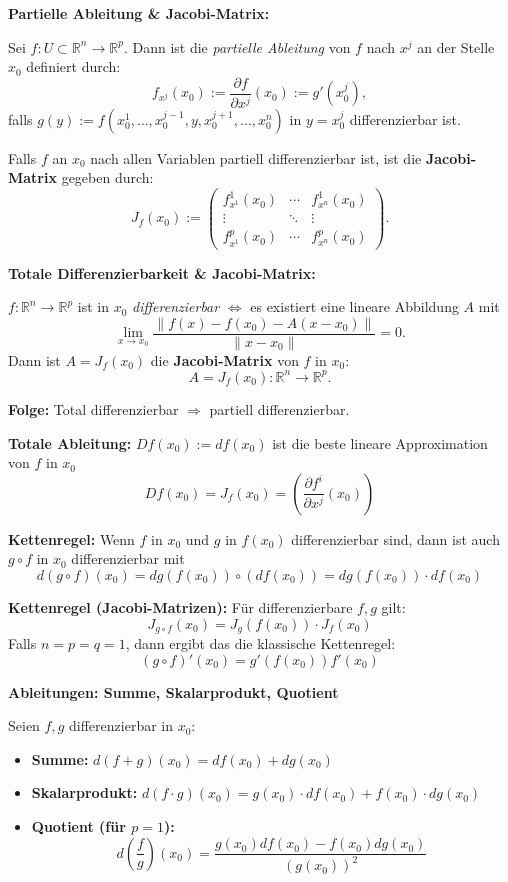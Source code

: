 \textbf{Partielle Ableitung \& Jacobi-Matrix:}

Sei $f : U \subset \mathbb{R}^n \to \mathbb{R}^p$. Dann ist die \emph{partielle Ableitung} von $f$ nach $x^j$ an der Stelle $x_0$ definiert durch:
\[
f_{x^j}(x_0) := \frac{\partial f}{\partial x^j}(x_0) := g'(x_0^j),
\]
falls $g(y) := f(x_0^1, \dots, x_0^{j-1}, y, x_0^{j+1}, \dots, x_0^n)$ in $y = x_0^j$ differenzierbar ist.

\vspace{2pt}

Falls $f$ an $x_0$ nach allen Variablen partiell differenzierbar ist, ist die \textbf{Jacobi-Matrix} gegeben durch:
\[
J_f(x_0) := \begin{pmatrix}
f_{x^1}^1(x_0) & \cdots & f_{x^n}^1(x_0) \\
\vdots & \ddots & \vdots \\
f_{x^1}^p(x_0) & \cdots & f_{x^n}^p(x_0)
\end{pmatrix}.
\]

\textbf{Totale Differenzierbarkeit \& Jacobi-Matrix:}

$f : \mathbb{R}^n \to \mathbb{R}^p$ ist in $x_0$ \emph{differenzierbar} $\Leftrightarrow$ es existiert eine lineare Abbildung $A$ mit
\[
\lim_{x \to x_0} \frac{\|f(x) - f(x_0) - A(x - x_0)\|}{\|x - x_0\|} = 0.
\]
Dann ist $A = J_f(x_0)$ die \textbf{Jacobi-Matrix} von $f$ in $x_0$:
\[
A = J_f(x_0) : \mathbb{R}^n \to \mathbb{R}^p.
\]

\textbf{Folge:} Total differenzierbar $\Rightarrow$ partiell differenzierbar.

\textbf{Totale Ableitung:}  
$Df(x_0) := df(x_0)$ ist die beste lineare Approximation von $f$ in $x_0$  
\[
Df(x_0) = J_f(x_0) = \left( \frac{\partial f^i}{\partial x^j}(x_0) \right)
\]

\textbf{Kettenregel:} Wenn $f$ in $x_0$ und $g$ in $f(x_0)$ differenzierbar sind, dann ist auch $g \circ f$ in $x_0$ differenzierbar mit
\[
d(g \circ f)(x_0) = dg(f(x_0)) \circ (df(x_0)) = dg(f(x_0)) \cdot df(x_0)
\]

\textbf{Kettenregel (Jacobi-Matrizen):} Für differenzierbare $f,g$ gilt:
\[
J_{g \circ f}(x_0) = J_g(f(x_0)) \cdot J_f(x_0)
\]
Falls $n = p = q = 1$, dann ergibt das die klassische Kettenregel:
\[
(g \circ f)'(x_0) = g'(f(x_0)) f'(x_0)
\]

\textbf{Ableitungen: Summe, Skalarprodukt, Quotient}

Seien $f, g$ differenzierbar in $x_0$:

\begin{itemize}
  \item \textbf{Summe:} $d(f + g)(x_0) = df(x_0) + dg(x_0)$
  \item \textbf{Skalarprodukt:} $d(f \cdot g)(x_0) = g(x_0) \cdot df(x_0) + f(x_0) \cdot dg(x_0)$
  \item \textbf{Quotient (für $p=1$):}
  \[
  d\left(\frac{f}{g}\right)(x_0) = \frac{g(x_0)df(x_0) - f(x_0)dg(x_0)}{(g(x_0))^2}
  \]
\end{itemize}

